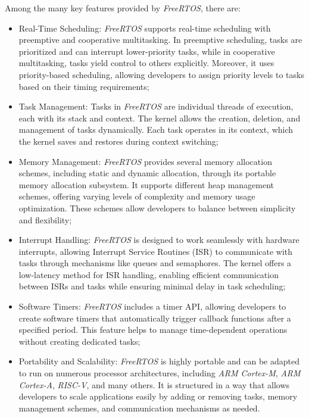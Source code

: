 Among the many key features provided by \textit{FreeRTOS}, there are:
\begin{itemize}
  \item Real-Time Scheduling: \textit{FreeRTOS} supports real-time scheduling with
    preemptive and cooperative multitasking. In preemptive scheduling, tasks are
    prioritized and can interrupt lower-priority tasks, while in cooperative
    multitasking, tasks yield control to others explicitly. Moreover, it uses priority-based
    scheduling, allowing developers to assign priority levels to tasks based on
    their timing requirements;

  \item Task Management: Tasks in \textit{FreeRTOS} are individual threads of execution,
    each with its stack and context. The kernel allows the creation, deletion, and
    management of tasks dynamically. Each task operates in its context, which the
    kernel saves and restores during context switching;

  \item Memory Management: \textit{FreeRTOS} provides several memory allocation schemes,
    including static and dynamic allocation, through its portable memory allocation
    subsystem. It supports different heap management schemes, offering varying levels
    of complexity and memory usage optimization. These schemes allow developers
    to balance between simplicity and flexibility;

  \item Interrupt Handling: \textit{FreeRTOS} is designed to work seamlessly with
    hardware interrupts, allowing Interrupt Service Routines (ISR) to
    communicate with tasks through mechanisms like queues and semaphores. The kernel
    offers a low-latency method for ISR handling, enabling efficient
    communication between ISRs and tasks while ensuring minimal delay in task
    scheduling;

  \item Software Timers: \textit{FreeRTOS} includes a timer API, allowing
    developers to create software timers that automatically trigger callback
    functions after a specified period. This feature helps to manage time-dependent
    operations without creating dedicated tasks;

  \item Portability and Scalability: \textit{FreeRTOS} is highly portable and can
    be adapted to run on numerous processor architectures, including \textit{ARM
    Cortex-M}, \textit{ARM Cortex-A}, \textit{RISC-V}, and many others. It is structured
    in a way that allows developers to scale applications easily by adding or removing
    tasks, memory management schemes, and communication mechanisms as needed.
\end{itemize}

